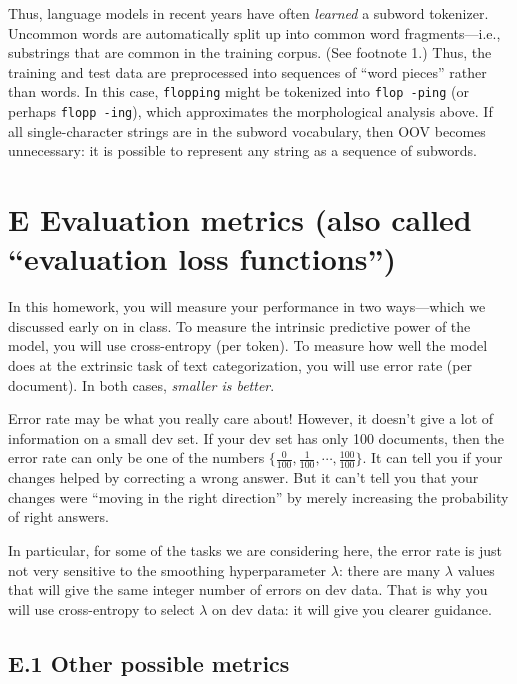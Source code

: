 Thus, language models in recent years have often \textit{learned} a subword tokenizer. Uncommon words are automatically split up into common word fragments—i.e., substrings that are common in the training corpus. (See footnote 1.) Thus, the training and test data are preprocessed into sequences of “word pieces” rather than words. In this case, \texttt{flopping} might be tokenized into \texttt{flop -ping} (or perhaps \texttt{flopp -ing}), which approximates the morphological analysis above. If all single-character strings are in the subword vocabulary, then OOV becomes unnecessary: it is possible to represent any string as a sequence of subwords.

\section*{E Evaluation metrics (also called ``evaluation loss functions'')}

In this homework, you will measure your performance in two ways—which we discussed early on in class. To measure the intrinsic predictive power of the model, you will use cross-entropy (per token). To measure how well the model does at the extrinsic task of text categorization, you will use error rate (per document). In both cases, \textit{smaller is better}.

Error rate may be what you really care about! However, it doesn’t give a lot of information on a small dev set. If your dev set has only 100 documents, then the error rate can only be one of the numbers $\{\tfrac{0}{100}, \tfrac{1}{100}, \cdots, \tfrac{100}{100}\}$. It can tell you if your changes helped by correcting a wrong answer. But it can’t tell you that your changes were “moving in the right direction” by merely increasing the probability of right answers.

In particular, for some of the tasks we are considering here, the error rate is just not very sensitive to the smoothing hyperparameter $\lambda$: there are many $\lambda$ values that will give the same integer number of errors on dev data. That is why you will use cross-entropy to select $\lambda$ on dev data: it will give you clearer guidance.

\subsection*{E.1 Other possible metrics}

